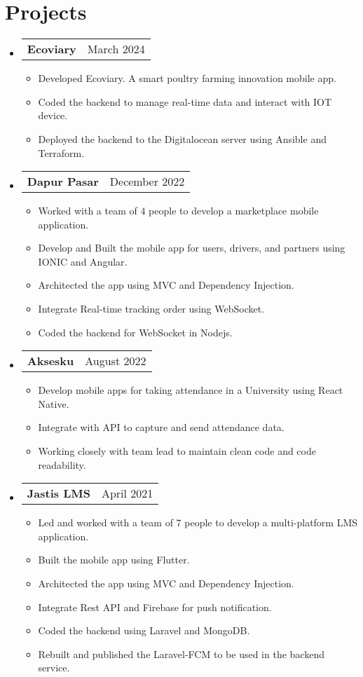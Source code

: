 \documentclass[a4paper,11pt]{article}
\makeatletter
\newcommand{\resumeProjectHeading}[2]{
\item
  \begin{tabular*}{0.97\textwidth}{l@{\extracolsep{\fill}}r}
    \small\textbf{#1} & #2 \\
  \end{tabular*}\vspace{-8pt}
}
\makeatother
\begin{document}
\section{Projects}
\begin{itemize}[leftmargin=0.15in, label={}]
    \resumeProjectHeading{Ecoviary}{March 2024}{}{}
    \begin{itemize}
      \item Developed Ecoviary. A smart poultry farming innovation mobile app.
      \item Coded the backend to manage real-time data and interact with IOT device.
      \item Deployed the backend to the Digitalocean server using Ansible and Terraform.
    \end{itemize}\vspace{-8pt}

    \resumeProjectHeading{Dapur Pasar}{December 2022}{}{}
    \begin{itemize}
      \item Worked with a team of 4 people to develop a marketplace mobile application.
      \item Develop and Built the mobile app for users, drivers, and partners using IONIC and Angular.
      \item Architected the app using MVC and Dependency Injection.
      \item Integrate Real-time tracking order using WebSocket.
      \item Coded the backend for WebSocket in Nodejs.
    \end{itemize}\vspace{-8pt}

    \resumeProjectHeading{Aksesku}{August 2022}{}{}
    \begin{itemize}
      \item Develop mobile apps for taking attendance in a University using React Native.
      \item Integrate with API to capture and send attendance data.
      \item Working closely with team lead to maintain clean code and code readability.
    \end{itemize}\vspace{-8pt}

    \resumeProjectHeading{Jastis LMS}{April 2021}{}{}
    \begin{itemize}
      \item Led and worked with a team of 7 people to develop a multi-platform LMS application.
      \item Built the mobile app using Flutter.
      \item Architected the app using MVC and Dependency Injection.
      \item Integrate Rest API and Firebase for push notification.
      \item Coded the backend using Laravel and MongoDB.
      \item Rebuilt and published the Laravel-FCM to be used in the backend service.
    \end{itemize}\vspace{-8pt}


\end{itemize}
\end{document}
